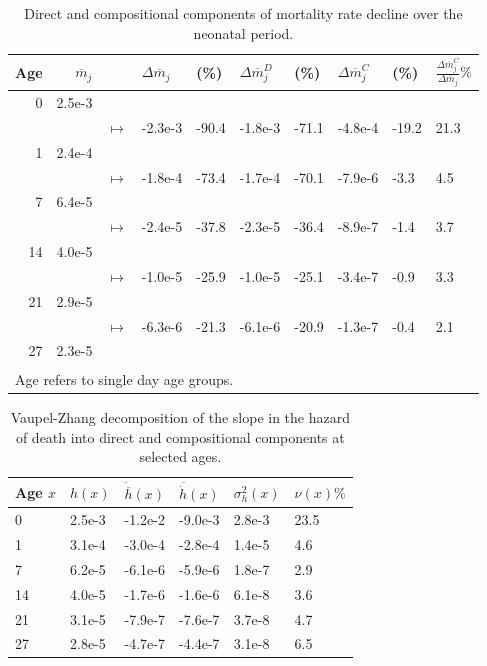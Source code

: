 \documentclass[10pt,twoside,reqno]{article}
\begin{document}
\begin{table}
\centering
\caption{\label{tab:tab-decomp-raw-rates}Direct and compositional components of mortality rate decline over the neonatal period.}
\centering
\begin{tabular}[t]{rrllllllll}
\toprule
Age & $\overline{m}_j$ &  & $\Delta \overline{m}_j$ & (\%) & $\Delta \overline{m}_j^D$ &  (\%) & $\Delta \overline{m}_j^C$ & (\%) & $\frac{\Delta \overline{m}_j^C}{\Delta \overline{m}_j}\%$\\
\midrule
0 & 2.5e-3 &  &  &  &  &  &  &  & \\
 &  & $\mapsto$ & -2.3e-3 & -90.4 & -1.8e-3 & -71.1 & -4.8e-4 & -19.2 & 21.3\\
1 & 2.4e-4 &  &  &  &  &  &  &  & \\
 &  & $\mapsto$ & -1.8e-4 & -73.4 & -1.7e-4 & -70.1 & -7.9e-6 & -3.3 & 4.5\\
7 & 6.4e-5 &  &  &  &  &  &  &  & \\
 &  & $\mapsto$ & -2.4e-5 & -37.8 & -2.3e-5 & -36.4 & -8.9e-7 & -1.4 & 3.7\\
14 & 4.0e-5 &  &  &  &  &  &  &  & \\
 &  & $\mapsto$ & -1.0e-5 & -25.9 & -1.0e-5 & -25.1 & -3.4e-7 & -0.9 & 3.3\\
21 & 2.9e-5 &  &  &  &  &  &  &  & \\
 &  & $\mapsto$ & -6.3e-6 & -21.3 & -6.1e-6 & -20.9 & -1.3e-7 & -0.4 & 2.1\\
27 & 2.3e-5 &  &  &  &  &  &  &  & \\
\bottomrule
\multicolumn{10}{l}{\textsuperscript{} Age refers to single day age groups.}\\
\end{tabular}
\end{table}

\begin{table}
\centering
\caption{\label{tab:tab-vaupel-zhang}Vaupel-Zhang decomposition of the slope in the hazard of death into direct and compositional components at selected ages.}
\centering
\begin{tabular}[t]{llllll}
\toprule
Age $x$ & $h(x)$ & $\dot{\overline{h}}(x)$ & $\overline{\dot{h}}(x)$ & $\sigma^2_h(x)$ & $\nu(x)\%$\\
\midrule
0 & 2.5e-3 & -1.2e-2 & -9.0e-3 & 2.8e-3 & 23.5\\
1 & 3.1e-4 & -3.0e-4 & -2.8e-4 & 1.4e-5 & 4.6\\
7 & 6.2e-5 & -6.1e-6 & -5.9e-6 & 1.8e-7 & 2.9\\
14 & 4.0e-5 & -1.7e-6 & -1.6e-6 & 6.1e-8 & 3.6\\
21 & 3.1e-5 & -7.9e-7 & -7.6e-7 & 3.7e-8 & 4.7\\
27 & 2.8e-5 & -4.7e-7 & -4.4e-7 & 3.1e-8 & 6.5\\
\bottomrule
\end{tabular}
\end{table}
\end{document}
